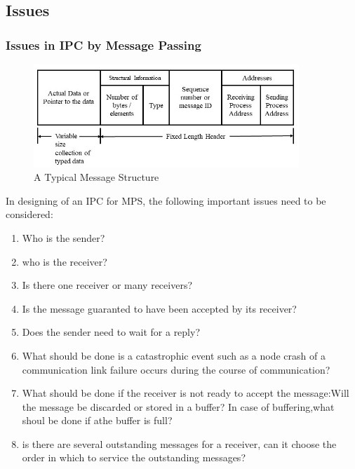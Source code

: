 \documentclass{beamer}
\begin{document}
\subsection{Issues}
\begin{frame}[allowframebreaks]
	\frametitle{Issues in IPC by Message Passing}
	\begin{figure}
		\centering
		\includegraphics[width=10cm]{messageStructure.jpg}
		\caption{A Typical Message Structure}
	\end{figure}
	\framebreak
	In designing of an IPC for MPS, the following important issues need to be considered:
	\begin{enumerate}
		\item Who is the sender?
		\item who is the receiver?
		\item Is there one receiver or many receivers?
		\item Is the message guaranted to have been accepted by its receiver?
		\item Does the sender need to wait for a reply?
		\item What should be done is a catastrophic event such as a node crash of a communication link failure occurs during the course of communication?
		\item What should be done if the receiver is not ready to accept the message:Will the message be discarded or stored in a buffer? In case of buffering,what shoul be done if athe buffer is full?
		\item is there are several outstanding messages for a receiver, can it choose the order in which to service the outstanding messages?
	\end{enumerate}	 
\end{frame}
\end{document}
